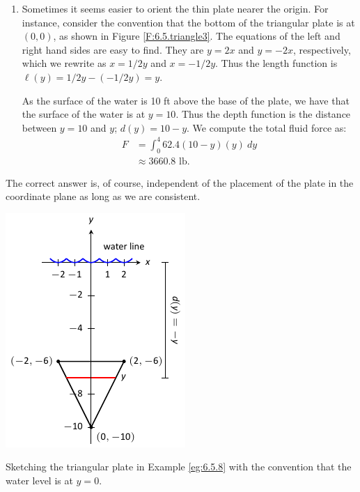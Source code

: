 \begin{example}
\begin{enumerate}
\item		Sometimes it seems easier to orient the thin plate nearer the origin. For instance, consider the convention that the bottom of the triangular plate is at $(0,0)$, as shown in Figure \ref{F:6.5.triangle3}. The equations of the left and right hand sides are easy to find. They are $y=2x$ and $y=-2x$, respectively, which we rewrite as $x= 1/2y$ and $x=-1/2y$. Thus the length function is $\ell(y) = 1/2y-(-1/2y) = y$. 

As the surface of the water is 10 ft above the base of the plate, we have that the surface of the water is at $y=10$. Thus the depth function is the distance between $y=10$ and $y$; $d(y) = 10-y$. We compute the total fluid force as:
\begin{align*}
F	&=\int_0^4 62.4(10-y)(y)\ dy \\
	&\approx 3660.8\text{ lb}.
\end{align*}
\end{enumerate}
The correct answer is, of course, independent of the placement of the plate in the coordinate plane as long as we are consistent.
\end{example}

\begin{marginfigure}[-22cm] %
\begin{center}
\includegraphics{figures/figfluid2b}
\end{center}
\caption{Sketching the triangular plate in Example \ref{eg:6.5.8} with the convention that the water level is at $y=0$.} \label{F:6.5.triangle2}
\end{marginfigure}

